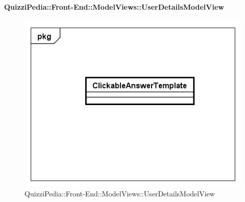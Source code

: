		\paragraph{QuizziPedia::Front-End::ModelViews::UserDetailsModelView}
		
		\label{QuizziPedia::Front-End::ModelViews::UserDetailsModelView}
		
		\begin{figure}[ht]
			\centering
			\includegraphics[scale=0.5,keepaspectratio]{UML/Classi/Front-End/QuizziPedia_Front-end_Templates_ClickableAnswerTemplate.png}
			\caption{QuizziPedia::Front-End::ModelViews::UserDetailsModelView}
		\end{figure} \FloatBarrier
		
